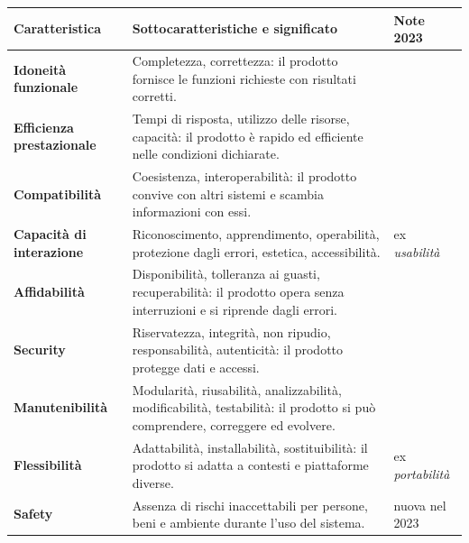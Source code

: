 \documentclass[12pt]{extarticle}
\begin{document}
\begin{center}
\small
\begin{tabular}{p{3.4cm}p{9.6cm}p{3.0cm}}
    \toprule
    \textbf{Caratteristica} & \textbf{Sottocaratteristiche e significato} & \textbf{Note 2023} \\
    \midrule
    \textbf{Idoneità funzionale} & Completezza, correttezza: il prodotto fornisce le funzioni richieste con risultati corretti. & \\
    \addlinespace
    \textbf{Efficienza prestazionale} & Tempi di risposta, utilizzo delle risorse, capacità: il prodotto è rapido ed efficiente nelle condizioni dichiarate. & \\
    \addlinespace
    \textbf{Compatibilità} & Coesistenza, interoperabilità: il prodotto convive con altri sistemi e scambia informazioni con essi. & \\
    \addlinespace
    \textbf{Capacità di interazione} & Riconoscimento, apprendimento, operabilità, protezione dagli errori, estetica, accessibilità. & ex \textit{usabilità} \\
    \addlinespace
    \textbf{Affidabilità} & Disponibilità, tolleranza ai guasti, recuperabilità: il prodotto opera senza interruzioni e si riprende dagli errori. & \\
    \addlinespace
    \textbf{Security} & Riservatezza, integrità, non ripudio, responsabilità, autenticità: il prodotto protegge dati e accessi. & \\
    \addlinespace
    \textbf{Manutenibilità} & Modularità, riusabilità, analizzabilità, modificabilità, testabilità: il prodotto si può comprendere, correggere ed evolvere. & \\
    \addlinespace
    \textbf{Flessibilità} & Adattabilità, installabilità, sostituibilità: il prodotto si adatta a contesti e piattaforme diverse. & ex \textit{portabilità} \\
    \addlinespace
    \textbf{Safety} & Assenza di rischi inaccettabili per persone, beni e ambiente durante l'uso del sistema. & nuova nel 2023 \\
    \bottomrule
\end{tabular}
\end{center}
\end{document}
